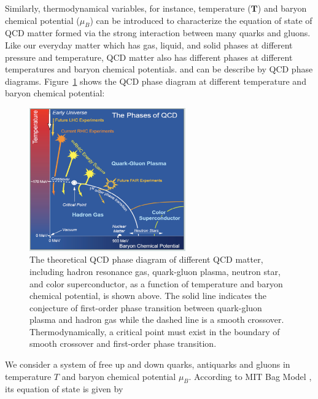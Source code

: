  
 \fi
Similarly, thermodynamical variables, for instance, temperature ($\mathbf{T}$) and baryon chemical potential ($\mu_{B}$) can be introduced to characterize the equation of state of QCD matter formed via the strong interaction between many quarks and gluons. %
Like our everyday matter which has gas, liquid, and solid phases at different pressure and temperature, QCD matter also has different phases at different temperatures and baryon chemical potentials. and can be describe by QCD phase diagrams. Figure~\ref{QCDPhaseDiagram} shows the QCD phase diagram at different temperature and baryon chemical potential:

\begin{figure}[hbtp]
\begin{center}
\includegraphics[width=0.60\textwidth]{Figures/Chapter1/QCDPhaseDiagram.png}
\caption{The theoretical QCD phase diagram of different QCD matter, including hadron resonance gas, quark-gluon plasma, neutron star, and color superconductor, as a function of temperature and baryon chemical potential, is shown above. The solid line indicates the conjecture of first-order phase transition between quark-gluon plasma and hadron gas while the dashed line is a smooth crossover. Thermodynamically, a critical point must exist in the boundary of smooth crossover and first-order phase transition.}
\label{QCDPhaseDiagram}
\end{center}
\end{figure} 

We consider a system of free up and down quarks, antiquarks and gluons in temperature $T$ and baryon chemical potential $\mu_B$. According to MIT Bag Model \cite{MITBag}, its equation of state is given by

